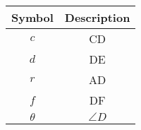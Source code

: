 \begin{tabular}{|c|c|}
\hline
Symbol & Description \\
\hline
$c$ & CD \\
\hline
$d$ & DE \\
\hline
$r$ & AD \\
\hline
$f$ & DF \\
\hline
$\theta$ & $\angle{D}$\\
\hline
\end{tabular}
